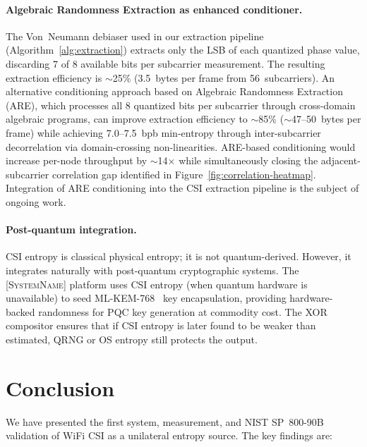 \documentclass[sigconf,nonacm=false,anonymous]{acmart}
\newcommand{\zipminator}{\textsc{[SystemName]}\xspace}
\begin{document}
\paragraph{Algebraic Randomness Extraction as enhanced conditioner.}
The Von~Neumann debiaser used in our extraction pipeline (Algorithm~\ref{alg:extraction}) extracts only the LSB of each quantized phase value, discarding 7 of 8 available bits per subcarrier measurement.
The resulting extraction efficiency is $\sim$25\% (3.5~bytes per frame from 56~subcarriers).
An alternative conditioning approach based on Algebraic Randomness Extraction (ARE), which processes all 8 quantized bits per subcarrier through cross-domain algebraic programs, can improve extraction efficiency to $\sim$85\% ($\sim$47--50~bytes per frame) while achieving 7.0--7.5~bpb min-entropy through inter-subcarrier decorrelation via domain-crossing non-linearities.
ARE-based conditioning would increase per-node throughput by $\sim$14$\times$ while simultaneously closing the adjacent-subcarrier correlation gap identified in Figure~\ref{fig:correlation-heatmap}.
Integration of ARE conditioning into the CSI extraction pipeline is the subject of ongoing work.

\paragraph{Post-quantum integration.}
CSI entropy is classical physical entropy; it is not quantum-derived.
However, it integrates naturally with post-quantum cryptographic systems.
The \zipminator platform uses CSI entropy (when quantum hardware is unavailable) to seed ML-KEM-768~\cite{nist2024fips203} key encapsulation, providing hardware-backed randomness for PQC key generation at commodity cost.
The XOR compositor ensures that if CSI entropy is later found to be weaker than estimated, QRNG or OS entropy still protects the output.


\section{Conclusion}
\label{sec:conclusion}

We have presented the first system, measurement, and NIST SP~800-90B validation of WiFi CSI as a unilateral entropy source.
The key findings are:
\end{document}
